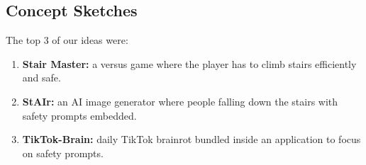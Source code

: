 \documentclass{article}
\begin{document}
\subsection{Concept Sketches}
The top 3 of our ideas were:

\begin{enumerate}
    \item \textbf{Stair Master:} a versus game where the player has to climb stairs efficiently and safe.
    \item \textbf{StAIr:} an AI image generator where people falling down the stairs with safety prompts embedded.
    \item \textbf{TikTok-Brain:} daily TikTok brainrot bundled inside an application to focus on safety prompts.
\end{enumerate}

\pagebreak
\end{document}
